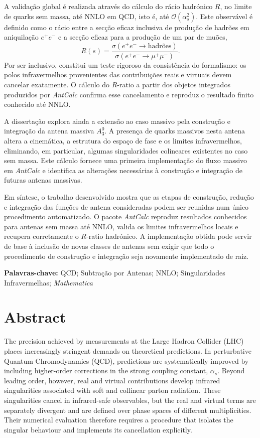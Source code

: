 A validação global é realizada através do cálculo do rácio hadrónico \(R\), no
limite de quarks sem massa, até NNLO em QCD, isto é, até \(\mathcal{O}(\alpha_s^2)\).
Este observável é definido como o rácio entre a secção eficaz inclusiva de produção
de hadrões em aniquilação \(e^+e^-\) e a secção eficaz para a produção de um par de
muões,
\[
R(s) = \frac{\sigma(e^+e^-\to\text{hadrões})}{\sigma(e^+e^-\to\mu^+\mu^-)}.
\]
Por
ser inclusivo, constitui um teste rigoroso da consistência do formalismo: os polos
infravermelhos provenientes das contribuições reais e virtuais devem cancelar
exatamente. O cálculo do \(R\)-ratio a partir dos objetos integrados produzidos por
\textit{AntCalc} confirma esse cancelamento e reproduz o resultado finito conhecido até NNLO.

A dissertação explora ainda a extensão ao caso massivo pela construção e integração 
da antena massiva \(A_3^0\). A presença de quarks massivos nesta antena altera a cinemática, a estrutura
do espaço de fase e os limites infravermelhos, eliminando, em particular, algumas 
singularidades colineares existentes no caso sem massa. Este cálculo fornece uma 
primeira implementação do fluxo massivo em \textit{AntCalc} e identifica as alterações 
necessárias à construção e integração de futuras antenas massivas.

Em síntese, o trabalho desenvolvido mostra que as etapas de construção, redução e
integração das funções de antena consideradas podem ser reunidas num único
procedimento automatizado. O pacote \textit{AntCalc} reproduz
resultados conhecidos para antenas sem massa até NNLO, valida os limites
infravermelhos locais e recupera corretamente o \(R\)-ratio hadrónico. A
implementação obtida pode servir de base à inclusão de novas classes de antenas sem
exigir que todo o procedimento de construção e integração seja novamente implementado
de raiz.

\vspace{1cm}
\noindent\textbf{Palavras-chave:} QCD; Subtração por Antenas; NNLO; Singularidades Infravermelhas; \textit{Mathematica}

\chapter*{Abstract}

The precision achieved by measurements at the Large Hadron Collider (LHC) places
increasingly stringent demands on theoretical predictions. In perturbative Quantum
Chromodynamics (QCD), predictions are systematically improved
by including higher-order corrections in the strong coupling constant, \(\alpha_s\).
Beyond leading order, however, real and virtual contributions develop infrared
singularities associated with soft and collinear parton radiation. These singularities
cancel in infrared-safe observables, but the real and virtual terms are separately
divergent and are defined over phase spaces of different multiplicities. Their numerical evaluation
therefore requires a procedure that isolates the singular behaviour and implements
its cancellation explicitly.

